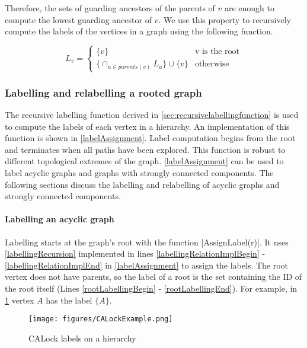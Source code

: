 Therefore, the sets of guarding ancestors of the parents of $v$ are enough to compute the lowest guarding ancestor of $v$. 
We use this property to recursively compute the labels of the vertices in a graph using the following function.

\begin{equation}\label{labellingRecursion}
	L_v = 
	\begin{cases}
		\{v\} & \text{v is the root} \\
		\{ \cap_{u\in parents(v)} L_u\} \cup \{v\} & \text{otherwise}
	\end{cases}
\end{equation}


\subsubsection{Labelling and relabelling a rooted graph}






The recursive labelling function derived in \cref{sec:recursivelabellingfunction} is used to compute the labels of each vertex in a hierarchy. An implementation of this function is shown in \cref{labelAssignment}. Label computation begins from the root and terminates when all paths have been explored. This function is robust to different topological extremes of the graph. \cref{labelAssignment} can be used to label acyclic graphs and graphs with strongly connected components. The following sections discuss the labelling and relabelling of acyclic graphs and strongly connected components. 

\paragraph{Labelling an acyclic graph}
Labelling starts at the graph's root with the function \inline|AssignLabel(r)|. It uses \cref{labellingRecursion} implemented in lines \ref{labellingRelationImplBegin} - \ref{labellingRelationImplEnd} in \cref{labelAssignment} to assign the labels. The root vertex does not have parents, so the label of a root is the set containing the ID of the root itself (Lines \ref{rootLabellingBegin} - \ref{rootLabellingEnd}). For example, in \cref{fig:calockexample} vertex $A$ has the label $\{A\}$.

\begin{figure}[h]
	\centering
	\captionsetup{justification=centering}
	\texttt{[image: figures/CALockExample.png]}
	\caption{CALock labels on a hierarchy}
	\label{fig:calockexample}
\end{figure}

